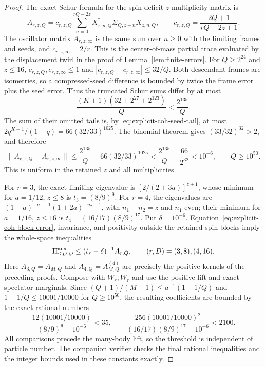 \documentclass[11pt]{article}
\begin{document}
\begin{proof}
The exact Schur formula for the spin-deficit-$z$ multiplicity matrix is
\begin{equation}
 A_{r,z,Q}=c_{r,z,Q}\sum_{n=0}^{rQ-2z}
       X_{z,n,Q}^\dagger\Sigma_{Q,z+n}X_{z,n,Q},\qquad
 c_{r,z,Q}=\frac{2Q+1}{rQ-2z+1}.
\end{equation}
The oscillator matrix $A_{r,z,\infty}$ is the same sum over $n\ge0$
with the limiting frames and seeds, and $c_{r,z,\infty}=2/r$.
This is the center-of-mass partial trace evaluated by the displacement
twirl in the proof of Lemma~\ref{lem:finite-errors}.
For $Q\ge2^{24}$ and $z\le16$,
$c_{r,z,Q},c_{r,z,\infty}\le1$ and
$|c_{r,z,Q}-c_{r,z,\infty}|\le32/Q$.
Both descendant frames are isometries, so a compressed-seed difference
is bounded by twice the frame error plus the seed error. Thus the
truncated Schur sums differ by at most
\begin{equation}
 \frac{(K+1)(32+2^{27}+2^{123})}Q<\frac{2^{135}}Q.
\end{equation}
The sum of their omitted tails is, by
\eqref{eq:explicit-coh-seed-tail}, at most
$2q^{K+1}/(1-q)=66(32/33)^{1025}$.
The binomial theorem gives $(33/32)^{32}>2$, and therefore
\begin{equation}\label{eq:explicit-coh-block-error}
 \|A_{r,z,Q}-A_{r,z,\infty}\|
 \le\frac{2^{135}}Q+66(32/33)^{1025}
 <\frac{2^{135}}Q+\frac{66}{2^{32}}<10^{-6},
 \qquad Q\ge10^{50}.
\end{equation}
This is uniform in the retained $z$ and all multiplicities.

For $r=3$, the exact limiting eigenvalue is
$[2/(2+3a)]^{z+1}$, whose minimum for $a=1/12$, $z\le8$ is
$t_3=(8/9)^9$. For $r=4$, the eigenvalues are
$(1+a)^{-n_1-1}(1+2a)^{-n_2-1}$, with $n_1+n_2=z$ and $n_1$ even;
their minimum for $a=1/16$, $z\le16$ is
$t_4=(16/17)(8/9)^{17}$. Put $\delta=10^{-6}$.
Equation~\eqref{eq:explicit-coh-block-error}, invariance, and positivity
outside the retained spin blocks imply the whole-space inequalities
\begin{equation}
 \Pi^{\rm aux}_{\le D,Q}\le(t_r-\delta)^{-1}A_{r,Q},
 \qquad (r,D)=(3,8),(4,16).
\end{equation}
Here $A_{3,Q}=A_{M,Q}$ and $A_{4,Q}=A^{(4)}_{M,Q}$ are precisely the
positive kernels of the preceding proofs. Compose with $W_r,W_r^\dagger$
and use the positive lift and exact spectator marginals. Since
$(Q+1)/(M+1)\le a^{-1}(1+1/Q)$ and
$1+1/Q\le10001/10000$ for $Q\ge10^{50}$, the resulting coefficients
are bounded by the exact rational numbers
\begin{equation}
 \frac{12(10001/10000)}{(8/9)^9-10^{-6}}<35,\qquad
 \frac{256(10001/10000)^2}{(16/17)(8/9)^{17}-10^{-6}}<2100.
\end{equation}
All comparisons precede the many-body lift, so the threshold is
independent of particle number. The companion verifier
 checks the final rational
inequalities and the integer bounds used in these constants exactly.
\end{proof}
\end{document}
